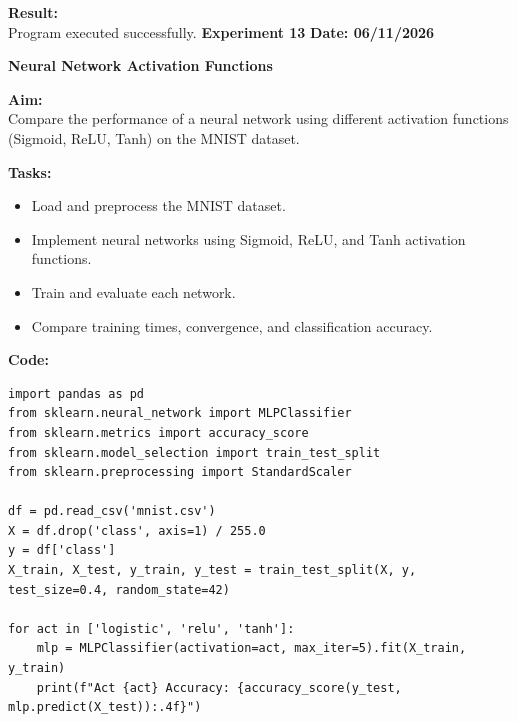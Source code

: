 \documentclass[12pt, a4paper]{article}
\begin{document}
\vspace{\baselineskip}

\noindent \textbf{Result:}\\
Program executed successfully.
\newpage
\noindent \textbf{Experiment 13} \hfill \textbf{Date: 06/11/2026}\\
\begin{center} \Large \textbf{Neural Network Activation Functions} \end{center}
\textbf{Aim:}\\
Compare the performance of a neural network using different activation functions (Sigmoid, ReLU, Tanh) on the MNIST dataset.

\vspace{\baselineskip}
\noindent \textbf{Tasks:}\\
\vspace{-0.5\baselineskip}
\begin{itemize}[nosep]
    \item Load and preprocess the MNIST dataset.
    \item Implement neural networks using Sigmoid, ReLU, and Tanh activation functions.
    \item Train and evaluate each network.
    \item Compare training times, convergence, and classification accuracy.
\end{itemize}

\vspace{\baselineskip}
\noindent \textbf{Code:}\\
\begin{lstlisting}
import pandas as pd
from sklearn.neural_network import MLPClassifier
from sklearn.metrics import accuracy_score
from sklearn.model_selection import train_test_split
from sklearn.preprocessing import StandardScaler

df = pd.read_csv('mnist.csv')
X = df.drop('class', axis=1) / 255.0
y = df['class']
X_train, X_test, y_train, y_test = train_test_split(X, y, test_size=0.4, random_state=42)

for act in ['logistic', 'relu', 'tanh']:
    mlp = MLPClassifier(activation=act, max_iter=5).fit(X_train, y_train)
    print(f"Act {act} Accuracy: {accuracy_score(y_test, mlp.predict(X_test)):.4f}")
\end{lstlisting}
\end{document}
